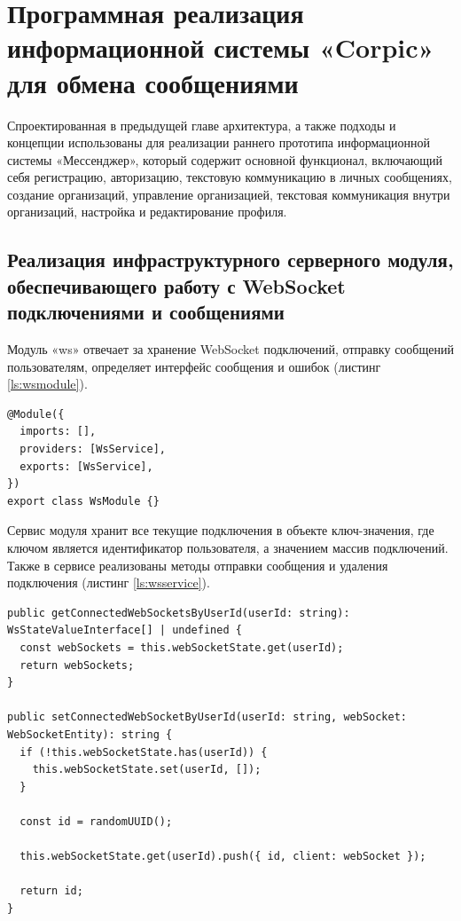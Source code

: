 \chapter{Программная реализация информационной системы «Corpic» для обмена сообщениями}

Спроектированная в предыдущей главе архитектура, а также подходы и концепции использованы для реализации раннего прототипа информационной системы «Мессенджер», который содержит основной функционал, включающий себя регистрацию, авторизацию, текстовую коммуникацию в личных сообщениях, создание организаций, управление организацией, текстовая коммуникация внутри организаций, настройка и редактирование профиля.

\section{Реализация инфраструктурного серверного модуля, обеспечивающего работу с WebSocket подключениями и сообщениями}

Модуль «ws» отвечает за хранение WebSocket подключений, отправку сообщений пользователям, определяет интерфейс сообщения и ошибок (листинг \ref{ls:wsmodule}).

\begin{lstlisting}[caption={Модуль работы с WebSocket подключениями}, label={ls:wsmodule}]
@Module({
  imports: [],
  providers: [WsService],
  exports: [WsService],
})
export class WsModule {}
\end{lstlisting}

Сервис модуля хранит все текущие подключения в объекте ключ-значения, где ключом является идентификатор пользователя, а значением массив подключений. Также в сервисе реализованы методы отправки сообщения и удаления подключения (листинг \ref{ls:wsservice}).

\begin{lstlisting}[caption={Примеры методов сервиса WsService}, label={ls:wsservice}]
public getConnectedWebSocketsByUserId(userId: string): WsStateValueInterface[] | undefined {
  const webSockets = this.webSocketState.get(userId);
  return webSockets;
}

public setConnectedWebSocketByUserId(userId: string, webSocket: WebSocketEntity): string {
  if (!this.webSocketState.has(userId)) {
    this.webSocketState.set(userId, []);
  }

  const id = randomUUID();

  this.webSocketState.get(userId).push({ id, client: webSocket });

  return id;
}
\end{lstlisting}

